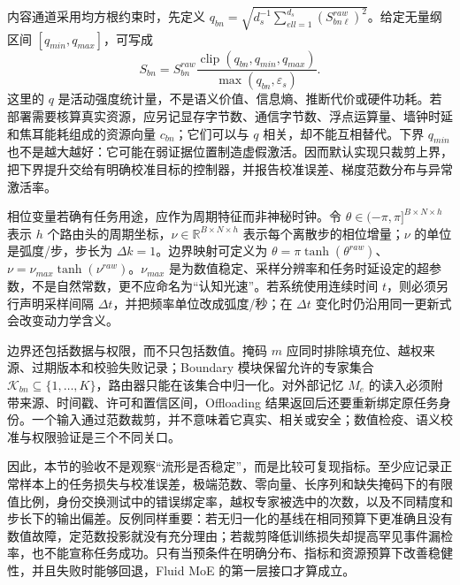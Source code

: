 内容通道采用均方根约束时，先定义 $q_{bn}=\sqrt{d_s^{-1}\sum_{ell=1}^{d_s}(S^{raw}_{bn\ell})^2}$。给定无量纲区间 $[q_{min},q_{max}]$，可写成
\begin{equation}
S_{bn}=S^{raw}_{bn}\frac{\operatorname{clip}(q_{bn},q_{min},q_{max})}{\max(q_{bn},\varepsilon_s)}.
\end{equation}
这里的 $q$ 是活动强度统计量，不是语义价值、信息熵、推断代价或硬件功耗。若部署需要核算真实资源，应另记显存字节数、通信字节数、浮点运算量、墙钟时延和焦耳能耗组成的资源向量 $c_{bn}$；它们可以与 $q$ 相关，却不能互相替代。下界 $q_{min}$ 也不是越大越好：它可能在弱证据位置制造虚假激活。因而默认实现只裁剪上界，把下界提升交给有明确校准目标的控制器，并报告校准误差、梯度范数分布与异常激活率。

相位变量若确有任务用途，应作为周期特征而非神秘时钟。令 $\theta\in(-\pi,\pi]^{B\times N\times h}$ 表示 $h$ 个路由头的周期坐标，$\nu\in\mathbb{R}^{B\times N\times h}$ 表示每个离散步的相位增量；$\nu$ 的单位是弧度/步，步长为 $\Delta k=1$。边界映射可定义为 $\theta=\pi\tanh(\theta^{raw})$、$\nu=\nu_{max}\tanh(\nu^{raw})$。$\nu_{max}$ 是为数值稳定、采样分辨率和任务时延设定的超参数，不是自然常数，更不应命名为“认知光速”。若系统使用连续时间 $t$，则必须另行声明采样间隔 $\Delta t$，并把频率单位改成弧度/秒；在 $\Delta t$ 变化时仍沿用同一更新式会改变动力学含义。

边界还包括数据与权限，而不只包括数值。掩码 $m$ 应同时排除填充位、越权来源、过期版本和校验失败记录；Boundary 模块保留允许的专家集合 $\mathcal{K}_{bn}\subseteq\{1,\ldots,K\}$，路由器只能在该集合中归一化。对外部记忆 $M_e$ 的读入必须附带来源、时间戳、许可和置信区间，Offloading 结果返回后还要重新绑定原任务身份。一个输入通过范数裁剪，并不意味着它真实、相关或安全；数值检疫、语义校准与权限验证是三个不同关口。

因此，本节的验收不是观察“流形是否稳定”，而是比较可复现指标。至少应记录正常样本上的任务损失与校准误差，极端范数、零向量、长序列和缺失掩码下的有限值比例，身份交换测试中的错误绑定率，越权专家被选中的次数，以及不同精度和步长下的输出偏差。反例同样重要：若无归一化的基线在相同预算下更准确且没有数值故障，定范数投影就没有充分理由；若裁剪降低训练损失却提高罕见事件漏检率，也不能宣称任务成功。只有当预条件在明确分布、指标和资源预算下改善稳健性，并且失败时能够回退，Fluid MoE 的第一层接口才算成立。
